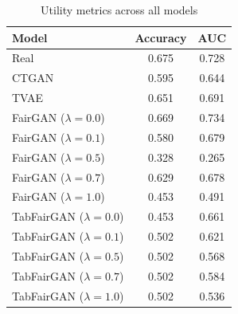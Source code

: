 \begin{table}[h!]
\label{tab:results-utility}
\centering
\begin{tabular}{lcc}
\toprule
Model & Accuracy & AUC \\
\midrule
Real & 0.675 & 0.728 \\
CTGAN & 0.595 & 0.644 \\
TVAE & 0.651 & 0.691 \\
FairGAN ($\lambda=0.0$) & 0.669 & 0.734 \\
FairGAN ($\lambda=0.1$) & 0.580 & 0.679 \\
FairGAN ($\lambda=0.5$) & 0.328 & 0.265 \\
FairGAN ($\lambda=0.7$) & 0.629 & 0.678 \\
FairGAN ($\lambda=1.0$) & 0.453 & 0.491 \\
TabFairGAN ($\lambda=0.0$) & 0.453 & 0.661 \\
TabFairGAN ($\lambda=0.1$) & 0.502 & 0.621 \\
TabFairGAN ($\lambda=0.5$) & 0.502 & 0.568 \\
TabFairGAN ($\lambda=0.7$) & 0.502 & 0.584 \\
TabFairGAN ($\lambda=1.0$) & 0.502 & 0.536 \\
\bottomrule
\end{tabular}
\caption{Utility metrics across all models}
\end{table}
